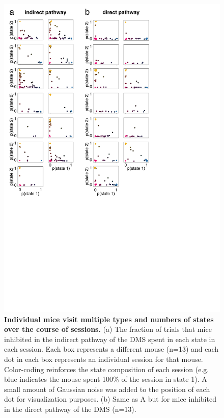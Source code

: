 \begin{figure}[t!]
  \begin{center}
    \includegraphics[width=0.70\linewidth]{ch7-appendix1/appendix1-figures/Supplementary_Fig4.pdf}
    \caption[Individual mice visit multiple types and numbers of states over the course of sessions]{\textbf{Individual mice visit multiple types and numbers of states over the course of sessions.} (a) The fraction of trials that mice inhibited in the indirect pathway of the DMS spent in each state in each session. Each box represents a different mouse (n=13) and each dot in each box represents an individual session for that mouse. Color-coding reinforces the state composition of each session (e.g. blue indicates the mouse spent 100\% of the session in state 1). A small amount of Gaussian noise was added to the position of each dot for visualization purposes. (b) Same as A but for mice inhibited in the direct pathway of the DMS (n=13).}
    \label{fig:ap1:supp4}
  \end{center}
\end{figure}
